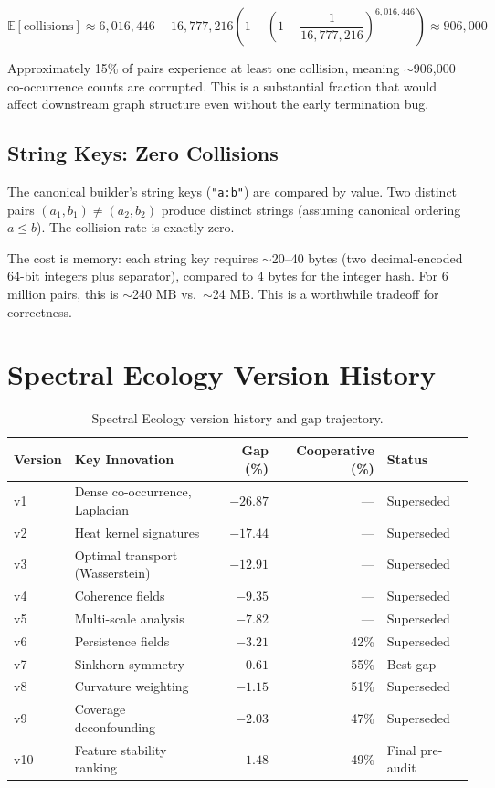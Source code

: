 \documentclass{../yalumba}
\begin{document}
\begin{equation}
  \mathbb{E}[\text{collisions}] \approx 6{,}016{,}446 - 16{,}777{,}216\left(1 - \left(1 - \frac{1}{16{,}777{,}216}\right)^{6{,}016{,}446}\right) \approx 906{,}000
\end{equation}

Approximately 15\% of pairs experience at least one collision, meaning
$\sim$906,000 co-occurrence counts are corrupted. This is a substantial
fraction that would affect downstream graph structure even without the early
termination bug.

\subsection{String Keys: Zero Collisions}

The canonical builder's string keys (\texttt{"a:b"}) are compared by value.
Two distinct pairs $(a_1, b_1) \neq (a_2, b_2)$ produce distinct strings
(assuming canonical ordering $a \leq b$). The collision rate is exactly zero.

The cost is memory: each string key requires $\sim$20--40 bytes (two
decimal-encoded 64-bit integers plus separator), compared to 4 bytes for the
integer hash. For 6 million pairs, this is $\sim$240 MB vs.\ $\sim$24 MB.
This is a worthwhile tradeoff for correctness.


\section{Spectral Ecology Version History}
\label{app:versions}

\begin{table}[H]
\centering
\caption{Spectral Ecology version history and gap trajectory.}
\label{tab:versions}
\begin{tabular}{llrrl}
\toprule
\rowcolor{table-header}
\textbf{Version} & \textbf{Key Innovation} & \textbf{Gap (\%)} & \textbf{Cooperative (\%)} & \textbf{Status} \\
\midrule
v1  & Dense co-occurrence, Laplacian     & $-26.87$ & ---  & Superseded \\
v2  & Heat kernel signatures             & $-17.44$ & ---  & Superseded \\
v3  & Optimal transport (Wasserstein)    & $-12.91$ & ---  & Superseded \\
v4  & Coherence fields                   & $-9.35$  & ---  & Superseded \\
v5  & Multi-scale analysis               & $-7.82$  & ---  & Superseded \\
v6  & Persistence fields                 & $-3.21$  & 42\% & Superseded \\
v7  & Sinkhorn symmetry                  & $-0.61$  & 55\% & Best gap \\
v8  & Curvature weighting                & $-1.15$  & 51\% & Superseded \\
v9  & Coverage deconfounding             & $-2.03$  & 47\% & Superseded \\
v10 & Feature stability ranking          & $-1.48$  & 49\% & Final pre-audit \\
\bottomrule
\end{tabular}
\end{table}
\end{document}
